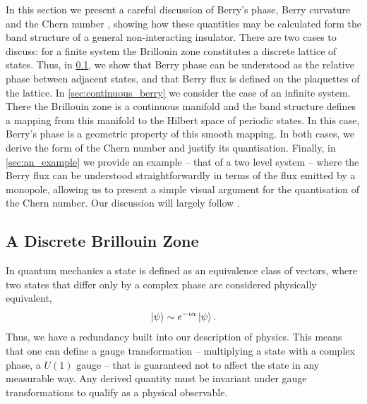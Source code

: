 
In this section we present a careful discussion of Berry's phase, Berry curvature and the Chern number \cite{berry_quantal_1984,avron_homotopy_1983}, showing how these quantities may be calculated form the band structure of a general non-interacting insulator. There are two cases to discuss: for a finite system the Brillouin zone constitutes a discrete lattice of states. Thus, in \textsection\ref{sec:discrete_berry}, we show that Berry phase can be understood as the relative phase between adjacent states, and that Berry flux is defined on the plaquettes of the lattice. In \textsection\ref{sec:continuous_berry} we consider the case of an infinite system. There the Brillouin zone is a continuous manifold and the band structure defines a mapping from this manifold to the Hilbert space of periodic states. In this case, Berry's phase is a geometric property of this smooth mapping. In both cases, we derive the form of the Chern number and justify its quantisation. Finally, in \textsection\ref{sec:an_example} we provide an example -- that of a two level system -- where the Berry flux can be understood straightforwardly in terms of the flux emitted by a monopole, allowing us to present a simple visual argument for the quantisation of the Chern number. Our discussion will largely follow \cite{asboth_berry_2016,resta_geometry_2020}.

\subsection{A Discrete Brillouin Zone} \label{sec:discrete_berry}

In quantum mechanics a state is defined as an equivalence class of vectors, where two states that differ only by a complex phase are considered physically equivalent,
\begin{align}
    \ket{\psi} \sim e^{-i\alpha}\ket{\psi}.
\end{align}
Thus, we have a redundancy built into our description of physics. This means that one can define a gauge transformation -- multiplying a state with a complex phase, a $U(1)$ gauge -- that is guaranteed not to affect the state in any measurable way. Any derived quantity must be invariant under gauge transformations to qualify as a physical observable.


